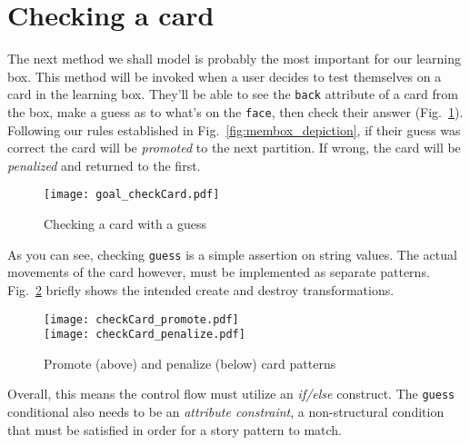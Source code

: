 \newpage
\hypertarget{sec:checkCard}{}
\section{Checking a card}
\genHeader

The next method we shall model is probably the most important for our learning box. This method will be invoked when a user decides to test themselves on a card
in the learning box. They'll be able to see the \texttt{back} attribute of a card from the box, make a guess as to what's on the \texttt{face}, then 
check their answer (Fig.~\ref{fig:goal_check}). Following our rules established in Fig.~\ref{fig:membox_depiction}, if their guess was correct the card will be
\emph{promoted} to the next partition. If wrong, the card will be \emph{penalized} and returned to the first.

\begin{figure}[htbp]
 	\centering
   \texttt{[image: goal\_checkCard.pdf]}
 	\caption{Checking a card with a guess}
 	\label{fig:goal_check}
\end{figure}
\FloatBarrier

As you can see, checking \texttt{guess} is a simple assertion on string values. The actual movements of the card however, must be implemented as separate
patterns. Fig.~\ref{fig:patterns_check} briefly shows the intended create and destroy transformations.

\begin{figure}[htbp]
 	\centering
   \texttt{[image: checkCard\_promote.pdf]}
   \\ \vspace{1cm}
    \texttt{[image: checkCard\_penalize.pdf]}
 	\caption{Promote (above) and penalize (below) card patterns}
 	\label{fig:patterns_check}
\end{figure}
\FloatBarrier

Overall, this means the control flow must utilize an \emph{if/else} construct. The \texttt{guess} conditional also needs to be an \emph{attribute
constraint}, a non-structural condition that must be satisfied in order for a story pattern to match. 





